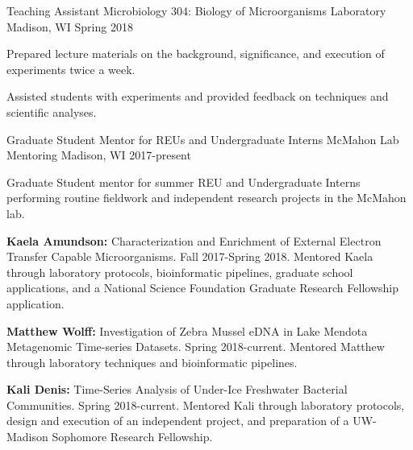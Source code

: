 

\begin{cventries}

  \cventry
    {Teaching Assistant} %
    {Microbiology 304: Biology of Microorganisms Laboratory} %
    {Madison, WI} %
    {Spring 2018} %
    {
      \begin{cvitems} %
        \item {Prepared lecture materials on the background, significance, and execution of experiments twice a week.}
        \item {Assisted students with experiments and provided feedback on techniques and scientific analyses.}
      \end{cvitems}
    }

  \cventry
    {Graduate Student Mentor for REUs and Undergraduate Interns} %
    {McMahon Lab Mentoring} %
    {Madison, WI} %
    {2017-present} %
    {
      \begin{cvitems} %
        \item {Graduate Student mentor for summer REU and Undergraduate Interns performing routine fieldwork and independent research projects in the McMahon lab.}
        \item {\textbf{Kaela Amundson:} Characterization and Enrichment of External Electron Transfer Capable Microorganisms. Fall 2017-Spring 2018. Mentored Kaela through laboratory protocols, bioinformatic pipelines, graduate school applications, and a National Science Foundation Graduate Research Fellowship application.}
        \item {\textbf{Matthew Wolff:} Investigation of Zebra Mussel eDNA in Lake Mendota Metagenomic Time-series Datasets. Spring 2018-current. Mentored Matthew through laboratory techniques and bioinformatic pipelines.}
        \item {\textbf{Kali Denis:} Time-Series Analysis of Under-Ice Freshwater Bacterial Communities. Spring 2018-current. Mentored Kali through laboratory protocols, design and execution of an independent project, and preparation of a UW-Madison Sophomore Research Fellowship.}
      \end{cvitems}
    }


\end{cventries}
